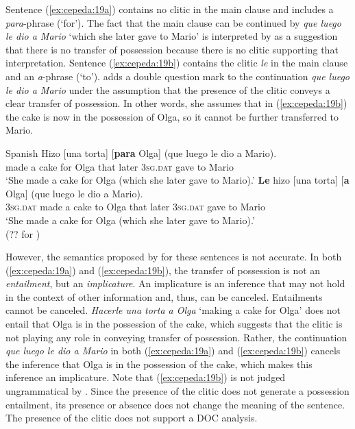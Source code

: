 \documentclass[output=paper,colorlinks,citecolor=brown,nonflat]{./langscibook}
\begin{document}
Sentence (\ref{ex:cepeda:19a}) contains no clitic in the main clause and includes a \textit{para}-phrase (‘for’). The fact that the main clause can be continued by \textit{que luego le dio a Mario} ‘which she later gave to Mario’ is interpreted by \citeauthor{Demonte1995} as a suggestion that there is no transfer of possession because there is no clitic supporting that interpretation. Sentence (\ref{ex:cepeda:19b}) contains the clitic \textit{le} in the main clause and an \textit{a}-phrase (‘to’). \citeauthor{Demonte1995} adds a double question mark to the continuation \textit{que luego le dio a Mario} under the assumption that the presence of the clitic conveys a clear transfer of possession. In other words, she assumes that in (\ref{ex:cepeda:19b}) the cake is now in the possession of Olga, so it cannot be further transferred to Mario.

\ea%
    \label{ex:cepeda:19} 
    Spanish
	\ea\label{ex:cepeda:19a}
	\gll Hizo [una torta] [\textbf{para} Olga] (que luego le   dio   a  Mario).\\
		made \hspaceThis{[}a cake \hspaceThis{[}for Olga that  later \textsc{3sg.dat} gave to Mario\\
	\glt ‘She made a cake for Olga (which she later gave to Mario).’
	\ex\label{ex:cepeda:19b}
	\gll  \textbf{Le}  hizo [una torta] [\textbf{a}  Olga] (que luego le  dio    a  Mario).\\
		\textsc{3sg.dat} made \hspaceThis{[}a cake \hspaceThis{[}to Olga that  later \textsc{3sg.dat} gave to Mario\\
	\glt ‘She made a cake for Olga (which she later gave to Mario).’\\
			(?? for \citeauthor{Demonte1995})
	\z
\z

However, the semantics proposed by \citeauthor{Demonte1995} for these sentences is not accurate. In both (\ref{ex:cepeda:19a}) and (\ref{ex:cepeda:19b}), the transfer of possession is not an \textit{entailment}, but an \textit{implicature}. An implicature is an inference that may not hold in the context of other information and, thus, can be canceled. Entailments cannot be canceled. \textit{Hacerle una torta a Olga} ‘making a cake for Olga’ does not entail that Olga is in the possession of the cake, which suggests that the clitic is not playing any role in conveying transfer of possession. Rather, the continuation \textit{que luego le dio a Mario} in both (\ref{ex:cepeda:19a}) and (\ref{ex:cepeda:19b}) cancels the inference that Olga is in the possession of the cake, which makes this inference an implicature. Note that (\ref{ex:cepeda:19b}) is not judged ungrammatical by \citeauthor{Demonte1995}. Since the presence of the clitic does not generate a possession entailment, its presence or absence does not change the meaning of the sentence. The presence of the clitic does not support a DOC analysis.
\end{document}
